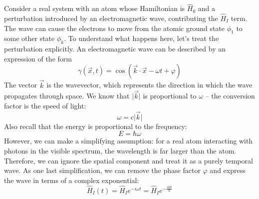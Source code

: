 Consider a real system with an atom whose Hamiltonian is $\hat{H}_0$ and a perturbation introduced
by an electromagnetic wave, contributing the $\hat{H}_I$ term. The wave can cause the electrons to
move from the atomic ground state $\phi_1$ to some other state $\phi_k$. To understand what happens
here, let's treat the perturbation explicitly. An electromagnetic wave can be described by an
expression of the form 
\begin{equation}
\gamma\left(\vec{x},t\right) = \cos \left(\vec{k} \cdot \vec{x} - \omega t + \varphi\right)
\end{equation}
The vector $\vec{k}$ is the wavevector, which represents the direction in which the wave propagates
through space. We know that $\vert\vec{k}\vert$ is proportional to $\omega$ -- the conversion
factor is the speed of light:
\begin{equation}
\omega = c\vert\vec{k}\vert
\end{equation}
Also recall that the energy is proportional to the frequency:
\begin{equation}
E = \hbar \omega
\end{equation}
However, we can make a simplifying assumption: for a real atom interacting with photons in the
visible spectrum, the wavelength is far larger than the atom. Therefore, we can ignore the spatial
component and treat it as a purely temporal wave. As one last simplification, we can remove the
phase factor $\varphi$ and express the wave in terms of a complex exponential:
\begin{equation}
\hat{H}_I\left(t\right) = \hat{H}_I e^{-i\omega t} = \hat{H}_I e^{-\frac{iEt}{\hbar}}
\end{equation}

